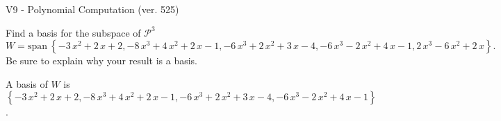 \begin{exercise}
  \begin{exerciseTitle}V9 - Polynomial Computation (ver. 525)\end{exerciseTitle}
  \begin{exerciseStatement}
    Find a basis for the subspace of \(\mathcal{P}^3\) 
\[W=\mathrm{span}\ \left\{-3 \, x^{2} + 2 \, x + 2 , -8 \, x^{3} + 4 \, x^{2} + 2 \, x - 1 , -6 \, x^{3} + 2 \, x^{2} + 3 \, x - 4 , -6 \, x^{3} - 2 \, x^{2} + 4 \, x - 1 , 2 \, x^{3} - 6 \, x^{2} + 2 \, x\right\}.\]
 Be sure to explain why your result is a basis.


  \end{exerciseStatement}
  \begin{exerciseAnswer}
   A basis of \(W\) is  \(\left\{-3 \, x^{2} + 2 \, x + 2 , -8 \, x^{3} + 4 \, x^{2} + 2 \, x - 1 , -6 \, x^{3} + 2 \, x^{2} + 3 \, x - 4 , -6 \, x^{3} - 2 \, x^{2} + 4 \, x - 1\right\}\).
  


  \end{exerciseAnswer}
\end{exercise}